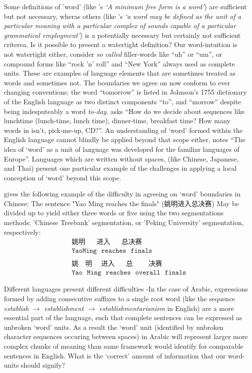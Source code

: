 Some definitions of 'word' (like \citeauthor{bloomfield-1926-a-set-of}'s \parencite*{bloomfield-1926-a-set-of} \emph{`A minimum free form is a word'}) are sufficient but not necessary, wheras others (like \citeauthor{lyons-1968-introduction}'s \parencite*{lyons-1968-introduction} \emph{`a word may be defined as the unit of a particular meaning with a particular complex of sounds capable of a particular grammatical employment'}) is a potentially necessary but certainly not sufficient criterea. Is it possible to present a watertight definition?
Our word-intuition is not watertight either, consider \emph{so called} filler-words like ``uh'' or ``um'', or compound forms like ``rock 'n' roll'' and ``New York'' always used as complete units. These are examples of language elements that are sometimes treated as words and sometimes not. The boundaries we agree on now conform to ever changing conventions; the word ``tomorrow'' is listed in Johnson's 1755 dictionary of the English language as two distinct components ``to'', and ``morrow'' despite being indesputeably a word \emph{to-day}. \textcite{halliday-2004-lexicology} asks ``How do we decide about sequences like lunchtime (lunch-time, lunch time), dinner-time, breakfast time? How many words in isn't, pick-me-up, CD?''.
An understanding of `word' formed within the English language cannot blindly be applied beyond that scope either, \cite{dixon02-word} notes ``The idea of ‘word’ as a unit of language was developed for the familiar languages of Europe''. Languages which are written without spaces, (like Chinese, Japanese, and Thai) present one particular example of the challenges in applying a local conception of `word' beyond this scope. 
\begin{example}
  \textcite{chen-2017-adversarial-multi} gives the following example of the difficulty in agreeing on `word' boundaries in Chinese: The sentence "Yao Ming reaches the finals" (姚明进入总决赛) May be divided up to yield either three words or five using the two segmentations methods; 'Chinese Treebank' segmentation, or 'Peking University' segmentation, respectively:
  \begin{align*}
    &\texttt{姚明~~~~~进入~~~~~总决赛~}\\
    &\texttt{YaoMing~~reaches~~finals}\\
    \\
    &\texttt{姚~~~明~~~~进入~~~~~总~~~~~~~决赛}\\
    &\texttt{Yao~~Ming~~reaches~~overall~~finals}
  \end{align*}
\end{example}
Different languages present different difficulties -In the case of Arabic, expressions formed by adding consecutive suffixes to a single root word (like the sequence \emph{establish $\to$ establishment $\to$ establishmentarianism} in English) are a more essential part of the language, such that complete sentences can be expressed as unbroken `word' units. As a result the `word' unit (identified by unbroken character sequences occuring between spaces) in Arabic will represent larger more complex chunks of meaning than same framework would identify for comparable sentences in English. What is the `correct' amount of information that our word-units should signify?

